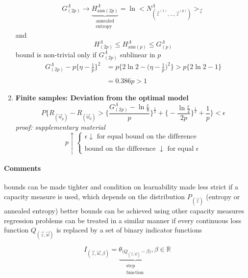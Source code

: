 \begin{enumerate}[(1)]
\begin{equation}
	G_{(2p)}^\Lambda \rightarrow \underbrace{ H_{\mathrm{ann}(2p)}^\Lambda }_{ \substack{
			\text{annealed} \\ \text{entropy} }}
		 = \ln 
		\Big< N_{(\vec{z}^{(1)}, \ldots, \vec{z}^{(p)})}^{\Lambda} 
		\Big>_{\vec{z}}
\end{equation}
and 
\begin{equation}
	H_{(2p)}^\Lambda \leq H_{\mathrm{ann} (p)}^\Lambda \leq G_{(p)}^\Lambda
\end{equation}
bound is non-trivial only if $G_{(2p)}^\Lambda$ sublinear in $p$
\begin{equation}
	\begin{array}{ll}
	G_{(2p)}^\Lambda - p \Big\{ \eta - \frac{1}{p} \Big\}^2
	& = p \Big\{ 2 \ln 2 - \Big( \eta -\frac{1}{p} \Big)^2 \Big\}
		> p \big\{ 2 \ln 2 - 1 \big\} \\\\
	& = 0.386p > 1
	\end{array}
\end{equation}
\item {\bf Finite samples: Deviation from the optimal model}
\begin{equation}
	P \Bigg\{ R_{(\vec{w}_p)} - R_{(\vec{w}_0)}
		> \Bigg\{ \frac{G_{(2p)}^\Lambda - \ln \frac{\epsilon}{8}}{p} 
		\Bigg\}^{\frac{1}{2}} 
		+ \bigg\{ -\frac{\ln \frac{\epsilon}{2}}{2p}
		\bigg\}^{\frac{1}{2}} + \frac{1}{p} \Bigg\} < \epsilon
\end{equation}
{\it proof: supplementary material}
\[ p \uparrow \left \{ \begin{array}{l}
	\epsilon \downarrow \text{ for equal bound on the difference} \\\\
	\text{bound on the difference } \downarrow \text{ for equal } \epsilon
\end{array} \right. \]
\end{enumerate}

\paragraph{Comments}
\begin{itemize}
  \itR bounds can be made tighter and condition on learnability made
  less strict if a capacity measure is used, which depends on the
  distribution $P_{(\vec{z})}$ (entropy or annealed entropy) \itR
  better bounds can be achieved using other capacity measures \itR
  regression problems can be treated in a similar manner if every
  continuous loss function $Q_{(\vec{z},\vec{w})}$ is replaced by a
  set of binary indicator functions
\end{itemize}
\begin{equation}
	I_{(\vec{z}, \vec{w}, \beta)} = \underbrace{ \theta_{\big( Q_{(\vec{z}, \vec{w})} 
		- \beta \big)} }_{ \substack{\text{step} \\ \text{function}}}, \beta \in \mathbb{R}
\end{equation}

